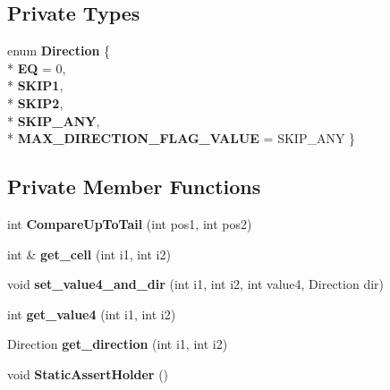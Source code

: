 \subsection*{Private Types}
\begin{DoxyCompactItemize}
\item 
enum {\bfseries Direction} \{ \\*
{\bfseries EQ} = 0, 
\\*
{\bfseries S\+K\+I\+P1}, 
\\*
{\bfseries S\+K\+I\+P2}, 
\\*
{\bfseries S\+K\+I\+P\+\_\+\+A\+NY}, 
\\*
{\bfseries M\+A\+X\+\_\+\+D\+I\+R\+E\+C\+T\+I\+O\+N\+\_\+\+F\+L\+A\+G\+\_\+\+V\+A\+L\+UE} = S\+K\+I\+P\+\_\+\+A\+NY
 \}\hypertarget{classv8_1_1internal_1_1_differencer_a8ce8afb8224c1cb080ecee6bf80dc104}{}\label{classv8_1_1internal_1_1_differencer_a8ce8afb8224c1cb080ecee6bf80dc104}

\end{DoxyCompactItemize}
\subsection*{Private Member Functions}
\begin{DoxyCompactItemize}
\item 
int {\bfseries Compare\+Up\+To\+Tail} (int pos1, int pos2)\hypertarget{classv8_1_1internal_1_1_differencer_a9a540cc91bb2b4fed87aaac833432be8}{}\label{classv8_1_1internal_1_1_differencer_a9a540cc91bb2b4fed87aaac833432be8}

\item 
int \& {\bfseries get\+\_\+cell} (int i1, int i2)\hypertarget{classv8_1_1internal_1_1_differencer_add21baf9d5b56c969146a61305b25237}{}\label{classv8_1_1internal_1_1_differencer_add21baf9d5b56c969146a61305b25237}

\item 
void {\bfseries set\+\_\+value4\+\_\+and\+\_\+dir} (int i1, int i2, int value4, Direction dir)\hypertarget{classv8_1_1internal_1_1_differencer_aaf180f1cba7f41455e4f67ba9829ec78}{}\label{classv8_1_1internal_1_1_differencer_aaf180f1cba7f41455e4f67ba9829ec78}

\item 
int {\bfseries get\+\_\+value4} (int i1, int i2)\hypertarget{classv8_1_1internal_1_1_differencer_a1f9254a1462722eb83151d070c5d4de9}{}\label{classv8_1_1internal_1_1_differencer_a1f9254a1462722eb83151d070c5d4de9}

\item 
Direction {\bfseries get\+\_\+direction} (int i1, int i2)\hypertarget{classv8_1_1internal_1_1_differencer_ae25d6a35c6a36e8495d26cb519026ef7}{}\label{classv8_1_1internal_1_1_differencer_ae25d6a35c6a36e8495d26cb519026ef7}

\item 
void {\bfseries Static\+Assert\+Holder} ()\hypertarget{classv8_1_1internal_1_1_differencer_a089cb311e1318be8879d98c8c35028b5}{}\label{classv8_1_1internal_1_1_differencer_a089cb311e1318be8879d98c8c35028b5}

\end{DoxyCompactItemize}
